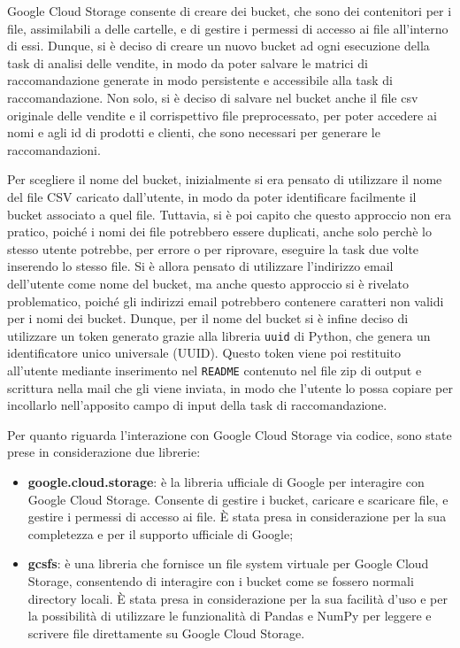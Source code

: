 Google Cloud Storage consente di creare dei bucket, che sono dei contenitori per i file, assimilabili a delle cartelle, e di gestire i permessi di accesso ai file all'interno di essi. Dunque, si è deciso di creare un nuovo bucket ad ogni esecuzione della task di analisi delle vendite, in modo da poter salvare le matrici di raccomandazione generate in modo persistente e accessibile alla task di raccomandazione. Non solo, si è deciso di salvare nel bucket anche il file csv originale delle vendite e il corrispettivo file preprocessato, per poter accedere ai nomi e agli id di prodotti e clienti, che sono necessari per generare le raccomandazioni.

Per scegliere il nome del bucket, inizialmente si era pensato di utilizzare il nome del file CSV caricato dall'utente, in modo da poter identificare facilmente il bucket associato a quel file. Tuttavia, si è poi capito che questo approccio non era pratico, poiché i nomi dei file potrebbero essere duplicati, anche solo perchè lo stesso utente potrebbe, per errore o per riprovare, eseguire la task due volte inserendo lo stesso file. Si è allora pensato di utilizzare l'indirizzo email dell'utente come nome del bucket, ma anche questo approccio si è rivelato problematico, poiché gli indirizzi email potrebbero contenere caratteri non validi per i nomi dei bucket.
Dunque, per il nome del bucket si è infine deciso di utilizzare un token generato grazie alla libreria \texttt{uuid} di Python, che genera un identificatore unico universale (UUID). Questo token viene poi restituito all'utente mediante inserimento nel \texttt{README} contenuto nel file zip di output e scrittura nella mail che gli viene inviata, in modo che l'utente lo possa copiare per incollarlo nell'apposito campo di input della task di raccomandazione.

Per quanto riguarda l'interazione con Google Cloud Storage via codice, sono state prese in considerazione due librerie:
\begin{itemize}
    \item \textbf{google.cloud.storage}: è la libreria ufficiale di Google per interagire con Google Cloud Storage. Consente di gestire i bucket, caricare e scaricare file, e gestire i permessi di accesso ai file. È stata presa in considerazione per la sua completezza e per il supporto ufficiale di Google;
    \item \textbf{gcsfs}: è una libreria che fornisce un file system virtuale per Google Cloud Storage, consentendo di interagire con i bucket come se fossero normali directory locali. È stata presa in considerazione per la sua facilità d'uso e per la possibilità di utilizzare le funzionalità di Pandas e NumPy per leggere e scrivere file direttamente su Google Cloud Storage.
\end{itemize}

